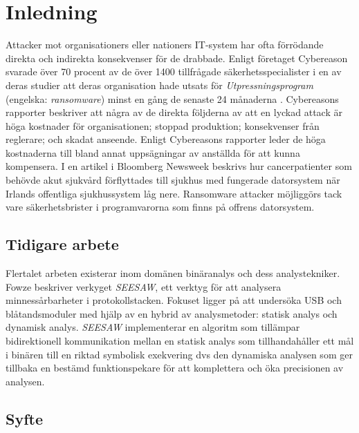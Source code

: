 \section{Inledning}

Attacker mot organisationers eller nationers IT-system har ofta förrödande
direkta och indirekta konsekvenser för de drabbade. Enligt företaget Cybereason
svarade över 70 procent av de över 1400 tillfrågade säkerhetsspecialister i en
av deras studier att deras organisation hade utsats för
\emph{Utpressningsprogram} (engelska: \emph{ransomware}) minst en gång de senaste
24 månaderna \cite{cyberreason2021, cyberreason2022}. Cybereasons rapporter
beskriver att några av de direkta följderna av att en lyckad attack är höga
kostnader för organisationen; stoppad produktion; konsekvenser från reglerare;
och skadat anseende. Enligt Cybereasons rapporter leder de höga kostnaderna till
bland annat uppsägningar av anställda för att kunna kompensera. I en artikel i
Bloomberg Newsweek \cite{gallagher2023} beskrivs hur cancerpatienter som behövde
akut sjukvård förflyttades till sjukhus med fungerade datorsystem när Irlands
offentliga sjukhussystem låg nere. \cite{hse_report} Ransomware attacker
möjliggörs tack vare säkerhetsbrister i programvarorna som finns på offrens
datorsystem.


\subsection{Tidigare arbete}
Flertalet arbeten existerar inom domänen binäranalys och dess analystekniker. Fowze \cite{fowze_mem_vul}
beskriver verkyget \emph{SEESAW}, ett verktyg för att analysera
minnessårbarheter i protokollstacken. Fokuset ligger på att undersöka USB och
blåtandsmoduler med hjälp av en hybrid av analysmetoder: statisk analys och
dynamisk analys. \emph{SEESAW} implementerar en algoritm som tillämpar
bidirektionell kommunikation mellan en statisk analys som tillhandahåller ett
mål i binären till en riktad symbolisk exekvering dvs den dynamiska analysen som
ger tillbaka en bestämd funktionspekare för att komplettera och öka precisionen
av analysen.  

\subsection{Syfte}

